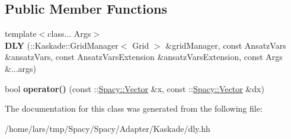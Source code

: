\subsection*{Public Member Functions}
\begin{DoxyCompactItemize}
\item 
{\footnotesize template$<$class... Args$>$ }\\{\bfseries D\+LY} (\+::Kaskade\+::\+Grid\+Manager$<$ Grid $>$ \&grid\+Manager, const Ansatz\+Vars \&ansatz\+Vars, const Ansatz\+Vars\+Extension \&ansatz\+Vars\+Extension, const Args \&...args)\hypertarget{classSpacy_1_1Kaskade_1_1DLY_ad6ad6ff4ac8b00b0f6c3a607e99f0a81}{}\label{classSpacy_1_1Kaskade_1_1DLY_ad6ad6ff4ac8b00b0f6c3a607e99f0a81}

\item 
bool {\bfseries operator()} (const \+::\hyperlink{classSpacy_1_1Vector}{Spacy\+::\+Vector} \&x, const \+::\hyperlink{classSpacy_1_1Vector}{Spacy\+::\+Vector} \&dx)\hypertarget{classSpacy_1_1Kaskade_1_1DLY_ad65881ff822a7407900909dcb8fad771}{}\label{classSpacy_1_1Kaskade_1_1DLY_ad65881ff822a7407900909dcb8fad771}

\end{DoxyCompactItemize}


The documentation for this class was generated from the following file\+:\begin{DoxyCompactItemize}
\item 
/home/lars/tmp/\+Spacy/\+Spacy/\+Adapter/\+Kaskade/dly.\+hh\end{DoxyCompactItemize}
